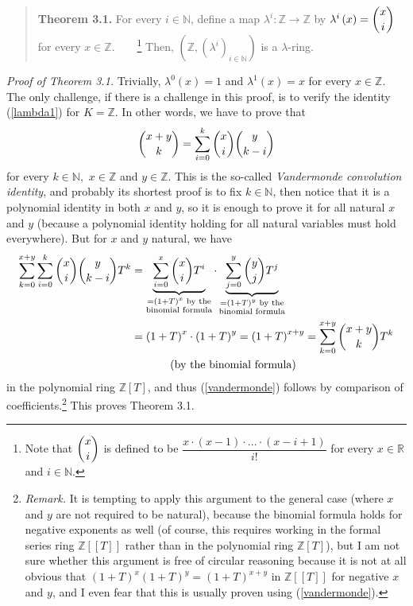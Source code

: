\documentclass[numbers=enddot,12pt,final,onecolumn,notitlepage]{scrartcl}%
\begin{document}
\begin{quote}
\textbf{Theorem 3.1.} For every $i\in\mathbb{N}$, define a map $\lambda
^{i}:\mathbb{Z}\rightarrow\mathbb{Z}$ by $\lambda^{i}\left(  x\right)
=\dbinom{x}{i}$ for every $x\in\mathbb{Z}$.\ \ \ \ \footnote{Note that
$\dbinom{x}{i}$ is defined to be $\dfrac{x\cdot\left(  x-1\right)
\cdot...\cdot\left(  x-i+1\right)  }{i!}$ for every $x\in\mathbb{R}$ and
$i\in\mathbb{N}$.} Then, $\left(  \mathbb{Z},\left(  \lambda^{i}\right)
_{i\in\mathbb{N}}\right)  $ is a $\lambda$-ring.
\end{quote}

\textit{Proof of Theorem 3.1.} Trivially, $\lambda^{0}\left(  x\right)  =1$
and $\lambda^{1}\left(  x\right)  =x$ for every $x\in\mathbb{Z}$. The only
challenge, if there is a challenge in this proof, is to verify the identity
(\ref{lambda1}) for $K=\mathbb{Z}$. In other words, we have to prove that%
\begin{equation}
\dbinom{x+y}{k}=\sum_{i=0}^{k}\dbinom{x}{i}\dbinom{y}{k-i} \label{vandermonde}%
\end{equation}
for every $k\in\mathbb{N},$ $x\in\mathbb{Z}$ and $y\in\mathbb{Z}.$ This is the
so-called \textit{Vandermonde convolution identity}, and probably its shortest
proof is to fix $k\in\mathbb{N}$, then notice that it is a polynomial identity
in both $x$ and $y$, so it is enough to prove it for all natural $x$ and $y$
(because a polynomial identity holding for all natural variables must hold
everywhere). But for $x$ and $y$ natural, we have%
\begin{align*}
\sum_{k=0}^{x+y}\sum_{i=0}^{k}\dbinom{x}{i}\dbinom{y}{k-i}T^{k}  &
=\underbrace{\sum_{i=0}^{x}\dbinom{x}{i}T^{i}}_{\substack{=\left(  1+T\right)
^{x}\text{ by the}\\\text{binomial formula}}}\cdot\underbrace{\sum_{j=0}%
^{y}\dbinom{y}{j}T^{j}}_{\substack{=\left(  1+T\right)  ^{y}\text{ by
the}\\\text{binomial formula}}}\\
&  =\left(  1+T\right)  ^{x}\cdot\left(  1+T\right)  ^{y}=\left(  1+T\right)
^{x+y}=\sum_{k=0}^{x+y}\dbinom{x+y}{k}T^{k}\\
&  \ \ \ \ \ \ \ \ \ \ \left(  \text{by the binomial formula}\right)
\end{align*}
in the polynomial ring $\mathbb{Z}\left[  T\right]  $, and thus
(\ref{vandermonde}) follows by comparison of
coefficients.\footnote{\textit{Remark.} It is tempting to apply this argument
to the general case (where $x$ and $y$ are not required to be natural),
because the binomial formula holds for negative exponents as well (of course,
this requires working in the formal series ring $\mathbb{Z}\left[  \left[
T\right]  \right]  $ rather than in the polynomial ring $\mathbb{Z}\left[
T\right]  $), but I am not sure whether this argument is free of circular
reasoning because it is not at all obvious that $\left(  1+T\right)
^{x}\left(  1+T\right)  ^{y}=\left(  1+T\right)  ^{x+y}$ in $\mathbb{Z}\left[
\left[  T\right]  \right]  $ for negative $x$ and $y$, and I even fear that
this is usually proven using (\ref{vandermonde}).} This proves Theorem 3.1.
\end{document}
